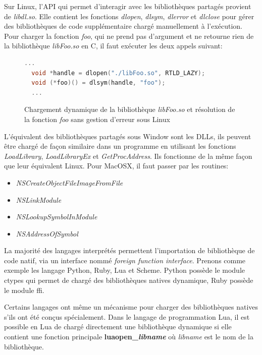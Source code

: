 \documentclass[12pt,initial,twoside,maitrise]{dms}
\numberwithin{equation}{section}
\numberwithin{table}{chapter}
\numberwithin{figure}{chapter}
\begin{document}
Sur Linux, l'API qui permet d'interagir avec les bibliothèques partagés provient de \textit{libdl.so}.
Elle contient les fonctions \textit{dlopen}, \textit{dlsym}, \textit{dlerror} et \textit{dlclose} pour gérer
des bibliothèques de code supplémentaire chargé manuellement à l'exécution.  Pour charger la fonction
\textit{foo}, qui ne prend pas d'argument et ne retourne rien de la bibliothèque \textit{libFoo.so} en C,
il faut exécuter les deux appels suivant:
\begin{center}
  \begin{figure}[ht]
\begin{lstlisting}[language=C,frame=single]
  ...
  void *handle = dlopen("./libFoo.so", RTLD_LAZY);
  void (*foo)() = dlsym(handle, "foo");
  ...
\end{lstlisting}
\caption{Chargement dynamique de la bibliothèque \textit{libFoo.so} et
résolution de la fonction \textit{foo} sans gestion d'erreur sous Linux}
  \end{figure}
\end{center}
L'équivalent des bibliothèques partagés sous Window sont les DLLs, ils peuvent être chargé de façon similaire dans un
programme en utilisant les fonctions \textit{LoadLibrary}, \textit{LoadLibraryEx} et \textit{GetProcAddress}. Ils
fonctionne de la même façon que leur équivalent Linux. Pour MacOSX, il faut passer par les routines:
\begin{itemize}
    \item \textit{NSCreateObjectFileImageFromFile}
    \item \textit{NSLinkModule}
    \item \textit{NSLookupSymbolInModule}
    \item \textit{NSAddressOfSymbol}
\end{itemize}

La majorité des langages interprétés permettent l'importation de bibliothèque de code natif, via un interface
nommé \textit{foreign function interface}.
Prenons comme exemple les langage Python, Ruby, Lua et Scheme. Python possède le module ctypes
qui permet de chargé des bibliothèques natives dynamique, Ruby possède le module ffi.


Certains langages ont même un mécanisme pour charger des bibliothèques natives s'ils ont été conçus spécialement.
Dans le langage de programmation Lua, il est possible en Lua de chargé directement
une bibliothèque dynamique si elle contient une fonction principale \textbf{luaopen\_\textit{libname}}
où \textit{libname} est le nom de la bibliothèque.
\end{document}
